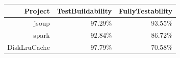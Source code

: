 \begin{figure}[!htb]
\begin{minipage}{.5\linewidth}
        \label{fig:disklrucache}
    \end{minipage}%
    \begin{minipage}{.5\linewidth}
        \centering
        \begin{tabular}{|r|r|r|}
        \hline
        \textbf{Project} & \textbf{TestBuildability} & \textbf{FullyTestability} \\ \hline
        jsoup            & 97.29\%                      & 93.55\%                      \\ \hline
        spark            & 92.84\%                      & 86.72\%                      \\ \hline
        DiskLruCache     & 97.79\%                      & 70.58\%                      \\ \hline
        \end{tabular}
        \vspace*{0.5cm}
        \label{table:projects-1}
    \end{minipage} 
\end{figure}



